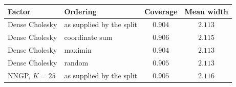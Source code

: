 \begin{tabular}{llcc}
\toprule
Factor & Ordering & Coverage & Mean width\\
\midrule
Dense Cholesky & as supplied by the split & $0.904$ & $2.113$\\
Dense Cholesky & coordinate sum & $0.906$ & $2.115$\\
Dense Cholesky & maximin & $0.904$ & $2.113$\\
Dense Cholesky & random & $0.905$ & $2.113$\\
NNGP, $K=25$ & as supplied by the split & $0.905$ & $2.116$\\
\bottomrule
\end{tabular}
